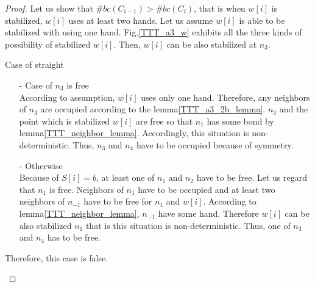 \documentclass[runningheads]{llncs}
\begin{document}
\begin{proof}
Let us show that $\#bc(C_{i-1}) > \#bc(C_i)$, that is when $w[i]$ is stabilized, $w[i]$ uses at least two hands.
Let us assume $w[i]$ is able to be stabilized with using one hand. Fig.\ref{TTT_a3_w} exhibits all the three kinds of possibility of stabilized $w[i]$. Then, $w[i]$ can be also stabilized at $n_3$. 

\begin{paragraph}{Case of straight}
\begin{itemize}
\item[-] Case of $n_3$ is free\\
According to assumption, $w[i]$ uses only one hand. Therefore, any neighbors of $n_3$ are occupied according to the lemma\ref{TTT_a3_2b_lemma}. $n_3$ and the point which is stabilized $w[i]$ are free so that $n_1$ has some bond by lemma\ref{TTT_neighbor_lemma}. Accordingly, this situation is non-deterministic. Thus, $n_3$ and $n_4$ have to be occupied because of symmetry.

\item[-] Otherwise\\
Because of  $S[i] = b$, at least one of $n_1$ and $n_2$ have to be free. Let us regard that $n_1$ is free. Neighbors of $n_1$ have to be occupied and at least two neighbors of $n_{-1}$ have to be free for $n_1$ and $w[i]$. According to lemma\ref{TTT_neighbor_lemma}, $n_{-1}$ have some hand. Therefore $w[i]$ can be also stabilized $n_1$ that is this situation is non-deterministic. Thus, one of $n_3$ and $n_4$ has to be free.
\end{itemize}

Therefore, this case is false.
\end{paragraph}


\end{proof}
\end{document}

